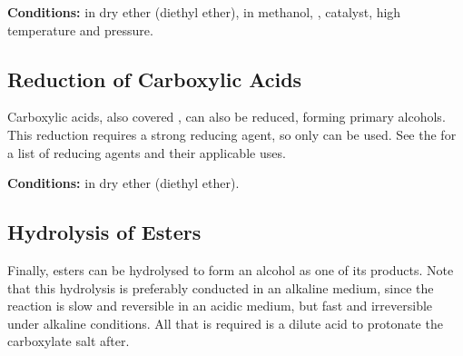			\vspace{1.5em}
			\vbox{\textbf{Conditions:}	\tabto{35mm} in dry ether (diethyl ether), 
  										\tabto{35mm} in methanol, 
  										\tabto{35mm},  catalyst, high temperature and pressure.}






		\pagebreak
		\subsection{Reduction of Carboxylic Acids}

			Carboxylic acids, also covered \hyperlink{ChapterCarboxylicAcids}{}, can also be reduced, forming primary alcohols.
			This reduction requires a strong reducing agent, so only  can be used. See the
			\hyperlink{AppendixReducingAgents}{} for a list of reducing agents and their applicable uses.

			\vspace{1.5em}
			\vbox{\textbf{Conditions:}\tabto{35mm} in dry ether (diethyl ether).}




		\subsection{Hydrolysis of Esters}

			Finally, esters can be hydrolysed to form an alcohol as one of its products. Note that this hydrolysis is preferably conducted
			in an alkaline medium, since the reaction is slow and reversible in an acidic medium, but fast and irreversible under
			alkaline conditions. All that is required is a dilute acid to protonate the carboxylate salt after.


